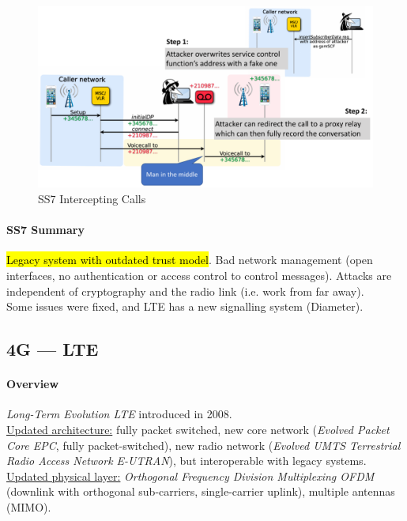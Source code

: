 \begin{figure}[h]
	\centering
	\includegraphics[scale=0.4]{images/10-ss7-calls.png}
	\caption{SS7 Intercepting Calls}
	\label{fig:ss7-calls}
\end{figure}

\paragraph{SS7 Summary}
\hl{Legacy system with outdated trust model}. Bad network management (open
interfaces, no authentication or access control to control messages). Attacks
are independent of cryptography and the radio link (i.e. work from far away).
\\ Some issues were fixed, and LTE has a new signalling system (Diameter).

\subsection{4G  --- LTE}

\paragraph{Overview}
\textit{Long-Term Evolution LTE} introduced in 2008.
\\
\underline{Updated architecture:}
fully packet switched, new core network (\textit{Evolved Packet Core EPC}, fully packet-switched), new radio network (\textit{Evolved UMTS Terrestrial Radio Access Network E-UTRAN}), but interoperable with legacy systems.
\\
\underline{Updated physical layer:}
\textit{Orthogonal Frequency Division Multiplexing OFDM} (downlink with orthogonal sub-carriers, single-carrier uplink), multiple antennas (MIMO).

